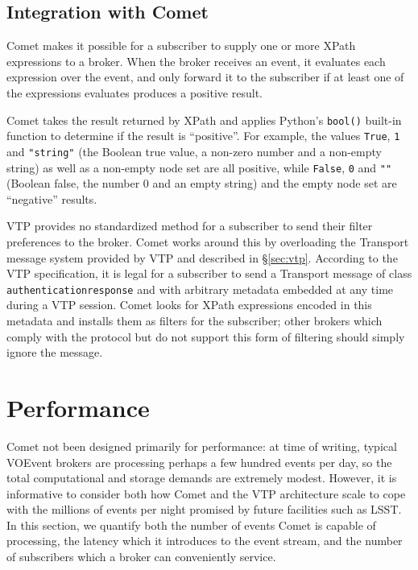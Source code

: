\documentclass[5p,authoryear]{elsarticle}
\begin{document}
\subsection{Integration with Comet}

Comet makes it possible for a subscriber to supply one or more XPath
expressions to a broker. When the broker receives an event, it evaluates each
expression over the event, and only forward it to the subscriber if at least
one of the expressions evaluates produces a positive result.

Comet takes the result returned by XPath and applies Python's \texttt{bool()}
built-in function to determine if the result is ``positive''. For example, the
values \texttt{True}, \texttt{1} and \texttt{"string"} (the Boolean true
value, a non-zero number and a non-empty string) as well as a non-empty node
set are all positive, while \texttt{False}, \texttt{0} and \texttt{""}
(Boolean false, the number 0 and an empty string) and the empty node set are
``negative'' results.

VTP provides no standardized method for a subscriber to send their filter
preferences to the broker. Comet works around this by overloading the
Transport message system provided by VTP and described in \S\ref{sec:vtp}.
According to the VTP specification, it is legal for a subscriber to send a
Transport message of class \texttt{authenticationresponse} and with arbitrary
metadata embedded at any time during a VTP session. Comet looks for XPath
expressions encoded in this metadata and installs them as filters for the
subscriber; other brokers which comply with the protocol but do not support
this form of filtering should simply ignore the message.

\section{Performance}
\label{sec:perf}

Comet not been designed primarily for performance: at time of writing, typical
VOEvent brokers are processing perhaps a few hundred events per day, so the
total computational and storage demands are extremely modest. However, it is
informative to consider both how Comet and the VTP architecture scale to cope
with the millions of events per night promised by future facilities such as
LSST. In this section, we quantify both the number of events Comet is capable
of processing, the latency which it introduces to the event stream, and the
number of subscribers which a broker can conveniently service.
\end{document}
